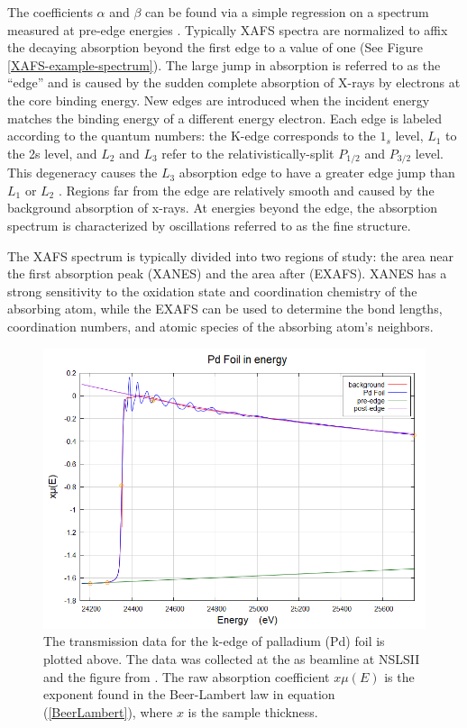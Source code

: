 \noindent The coefficients $ \alpha $ and $ \beta $ can be found via a simple regression on a spectrum measured at pre-edge energies \cite{klementev2000xafs}. Typically XAFS spectra are normalized to affix the decaying absorption beyond the first edge to a value of one (See Figure \ref{XAFS-example-spectrum}). The large jump in absorption is referred to as the ``edge'' and is caused by the sudden complete absorption of X-rays by electrons at the core binding energy. New edges are introduced when the incident energy matches the binding energy of a different energy electron. Each edge is labeled according to the quantum numbers: the K-edge corresponds to the $ 1_s $ level, $ L_1 $  to the 2s level, and $ L_2 $ and $ L_3 $  refer to the relativistically-split $ P_{1/2} $  and $ P_{3/2} $ level. This degeneracy causes the $ L_3 $ absorption edge to have a greater edge jump than $ L_1 $ or $ L_2 $ \cite{absorptionSpecArticle}. Regions far from the edge are relatively smooth and caused by the background absorption of x-rays. At energies beyond the edge, the absorption spectrum is characterized by oscillations referred to as the fine structure.

The XAFS spectrum is typically divided into two regions of study: the area near the first absorption peak (XANES) and the area after (EXAFS). XANES has a strong sensitivity to the oxidation state and coordination chemistry of the absorbing atom, while the EXAFS can be used to determine the bond lengths, coordination numbers, and atomic species of the absorbing atom's neighbors.

\begin{figure}
    \centering
    \includegraphics[width=.75\linewidth]{Chapters/Figures/un-normalized-xafs.png}
    \caption[Raw XAFS Spectrum]{The transmission data for the k-edge of palladium (Pd) foil is plotted above. The data was collected at the as beamline at NSLSII and the figure from \cite{nicks-thesis}. The raw absorption coefficient $ x \mu(E) $ is the exponent found in the Beer-Lambert law in equation (\ref{BeerLambert}), where $ x $ is the sample thickness.}
    \label{fig:Unnormalized-XAFS}
\end{figure}

